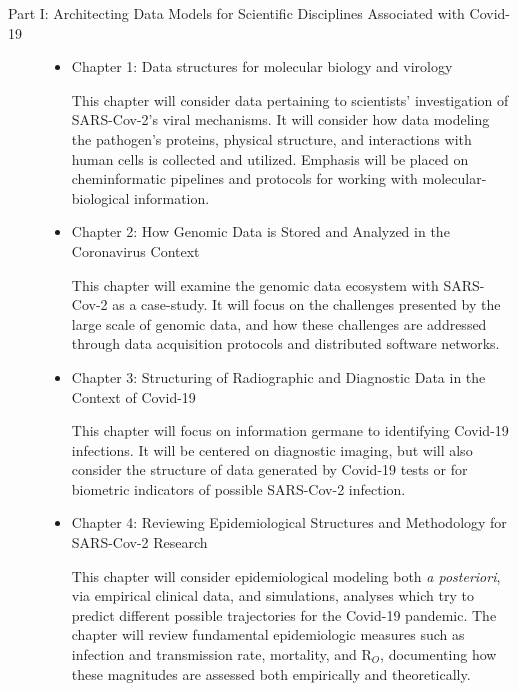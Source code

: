 \documentclass{statsoc}
\newenvironment{summary}[1][0]{\let\BEGIN\begin\let\END\end\grabsummary{#1}}{}%
\begin{document}
\begin{description}

\item[Part I: Architecting Data Models for Scientific Disciplines Associated with Covid-19]

\begin{itemize}
\item Chapter 1: Data structures for molecular biology and virology

\begin{summary}
This chapter will consider data pertaining to scientists' 
investigation of SARS-Cov-2's viral mechanisms.  It will 
consider how data modeling the pathogen's proteins, 
physical structure, and interactions with human cells 
is collected and utilized.  Emphasis will be placed 
on cheminformatic pipelines and protocols for 
working with molecular-biological information.   
\end{summary}

\item Chapter 2: How Genomic Data is Stored and Analyzed in the Coronavirus Context

\begin{summary}
This chapter will examine the genomic data ecosystem with SARS-Cov-2 
as a case-study.  It will focus on the challenges presented 
by the large scale of genomic data, and how these challenges 
are addressed through data acquisition protocols and 
distributed software networks. 
\end{summary}

\item Chapter 3: Structuring of Radiographic and Diagnostic Data in the Context of Covid-19

\begin{summary}
This chapter will focus on information germane to identifying Covid-19 infections.  
It will be centered on diagnostic imaging, but will also consider 
the structure of data generated by Covid-19 tests or for 
biometric indicators of possible SARS-Cov-2 infection.
\end{summary}

\item Chapter 4: Reviewing Epidemiological Structures and Methodology for SARS-Cov-2 Research

\begin{summary}
This chapter will consider epidemiological modeling both \textit{a posteriori}, 
via empirical clinical data, and simulations, analyses which try to 
predict different possible trajectories for the Covid-19 pandemic.  
The chapter will review fundamental epidemiologic measures such 
as infection and transmission rate, mortality, and R$_O$, documenting 
how these magnitudes are assessed both empirically and theoretically. 
\end{summary}


\end{itemize}
\end{description}
\end{document}
